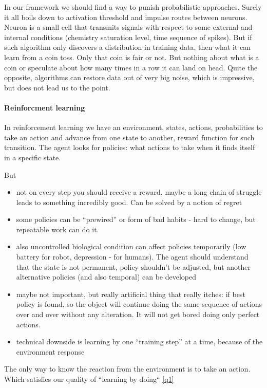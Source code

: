 \documentclass[draft]{article}
\begin{document}
In our framework we should find a way to punish probabilistic approaches. Surely it all boils down to activation threshold and impulse routes between neurons.
Neuron is a small cell that transmits signals with respect to some external and internal conditions (chemistry saturation level, time sequence of spikes). But if such algorithm only discovers a distribution in training data, then what it can learn from a coin toss. Only that coin is fair or not. But nothing about what is a coin or speculate about how many times in a row it can land on head. Quite the opposite, algorithms can restore data out of very big noise, which is impressive, but does not lead us to the point.


\paragraph{Reinforcment learning}
In reinforcement learning we have an environment, states, actions, probabilities to take an action and advance from one state to another, reward function for such transition. The agent looks for policies: what actions to take when it finds itself in a specific state.

But

\begin{itemize}
\item  not on every step you should receive a reward. maybe a long chain of struggle leads to something incredibly good. Can be solved by a notion of regret
\item some policies can be “prewired” or form of bad habits - hard to change, but repeatable work can do it.
\item also uncontrolled biological condition can affect policies temporarily (low battery for robot, depression - for humans). The agent should understand that the state is not permanent, policy shouldn’t be adjusted, but another alternative policies (and also temporal) can be developed
\item maybe not important, but really artificial thing that really itches: if best policy is found, so the object will continue doing the same sequence of actions over and over without any alteration. It will not get bored doing only perfect actions.
\item technical downside is learning by one “training step” at a time, because of the environment response
\end{itemize}

The only way to know the reaction from the environment is to take an action. Which satisfies our quality of “learning by doing“ \ref{q1}
\end{document}
